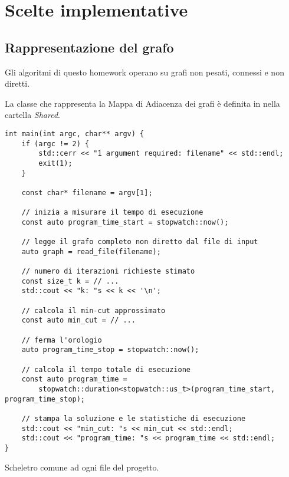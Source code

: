 \section{Scelte implementative}
\label{cap:implementation-choices}

\subsection{Rappresentazione del grafo}
\label{sub:graph-representation}

Gli algoritmi di questo homework operano su grafi non pesati, connessi e non diretti.


\noindent La classe che rappresenta la Mappa di Adiacenza dei grafi è definita in  nella cartella \textit{Shared}.

\begin{listing}[!ht]
\begin{verbatim}
int main(int argc, char** argv) {
    if (argc != 2) {
        std::cerr << "1 argument required: filename" << std::endl;
        exit(1);
    }

    const char* filename = argv[1];

    // inizia a misurare il tempo di esecuzione
    const auto program_time_start = stopwatch::now();

    // legge il grafo completo non diretto dal file di input
    auto graph = read_file(filename);

    // numero di iterazioni richieste stimato
    const size_t k = // ...
    std::cout << "k: "s << k << '\n';

    // calcola il min-cut approssimato
    const auto min_cut = // ...
    
    // ferma l'orologio
    auto program_time_stop = stopwatch::now();

    // calcola il tempo totale di esecuzione
    const auto program_time =
        stopwatch::duration<stopwatch::us_t>(program_time_start, program_time_stop);

    // stampa la soluzione e le statistiche di esecuzione
    std::cout << "min_cut: "s << min_cut << std::endl;
    std::cout << "program_time: "s << program_time << std::endl;
}
\end{verbatim}
\caption{Scheletro comune ad ogni file  del progetto.}
\label{listing:main-cpp}
\end{listing}

